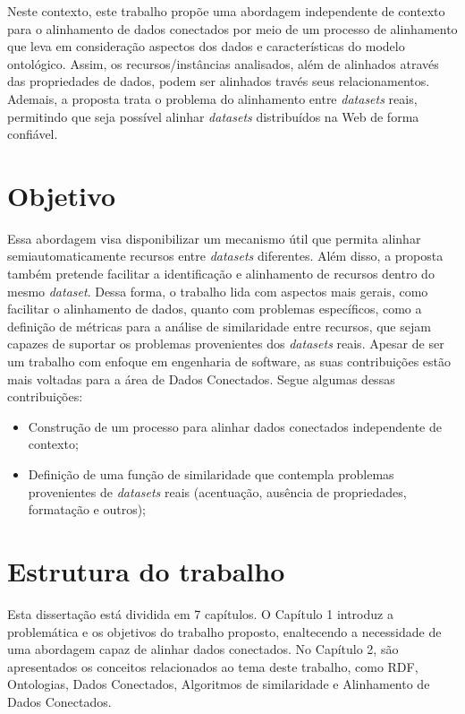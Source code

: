 Neste contexto, este trabalho propõe uma abordagem independente de contexto para o alinhamento de dados conectados por meio de um processo de alinhamento que leva em consideração aspectos dos dados e  características do modelo ontológico. Assim, os recursos/instâncias analisados, além de alinhados através das propriedades de dados, podem ser alinhados través seus relacionamentos. Ademais, a proposta trata o problema do alinhamento entre \textit{datasets} reais, permitindo que seja possível alinhar \textit{datasets} distribuídos na Web de forma confiável.

\section{Objetivo}

Essa abordagem visa disponibilizar um mecanismo útil que permita alinhar semiautomaticamente recursos entre \textit{datasets} diferentes. Além disso, a proposta também pretende facilitar a identificação e alinhamento de recursos dentro do mesmo \textit{dataset}.
Dessa forma, o trabalho lida com aspectos mais gerais, como facilitar o alinhamento de dados, quanto com problemas específicos, como a definição de métricas para a análise de similaridade entre recursos, que sejam capazes de suportar os problemas provenientes dos \textit{datasets} reais. Apesar de ser um trabalho com enfoque em engenharia de software, as suas contribuições estão mais voltadas para a área de Dados Conectados. Segue algumas dessas contribuições:

\begin{itemize}
        \item Construção de um processo para alinhar dados conectados independente de contexto;
        \item Definição de uma função de similaridade que contempla problemas provenientes de \textit{datasets} reais (acentuação, ausência de propriedades, formatação e outros);
\end{itemize}

\section{Estrutura do trabalho}

Esta dissertação está dividida em 7 capítulos. O Capítulo 1 introduz a problemática e os objetivos do trabalho proposto, enaltecendo a necessidade de uma abordagem capaz de alinhar dados conectados. No Capítulo 2, são apresentados os conceitos relacionados ao tema deste trabalho, como RDF, Ontologias, Dados Conectados, Algoritmos de similaridade e Alinhamento de Dados Conectados.

